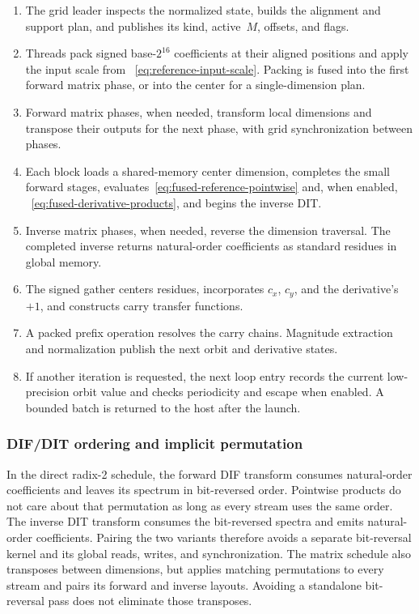\begin{enumerate}
  \item The grid leader inspects the normalized state, builds the alignment and
        support plan, and publishes its kind, active~$M$, offsets, and flags.
  \item Threads pack signed base-$2^{16}$ coefficients at their aligned
        positions and apply the input scale from
        ~\eqref{eq:reference-input-scale}.  Packing is fused into the first
        forward matrix phase, or into the center for a single-dimension plan.
  \item Forward matrix phases, when needed, transform local dimensions and
        transpose their outputs for the next phase, with grid synchronization
        between phases.
  \item Each block loads a shared-memory center dimension, completes the small
        forward stages, evaluates~\eqref{eq:fused-reference-pointwise} and, when enabled,
        ~\eqref{eq:fused-derivative-products}, and begins the inverse DIT.
  \item Inverse matrix phases, when needed, reverse the dimension traversal.
        The completed inverse returns natural-order coefficients as standard
        residues in global memory.
  \item The signed gather centers residues, incorporates $c_x$, $c_y$, and the
        derivative's $+1$, and constructs carry transfer functions.
  \item A packed prefix operation resolves the carry chains.  Magnitude
        extraction and normalization publish the next orbit and derivative
        states.
  \item If another iteration is requested, the next loop entry records the
        current low-precision orbit value and checks periodicity and escape
        when enabled.  A bounded batch is returned to the host after the launch.
\end{enumerate}

\subsubsection{DIF/DIT ordering and implicit permutation}

In the direct radix-2 schedule, the forward DIF transform consumes natural-order
coefficients and leaves its spectrum in bit-reversed order.  Pointwise products do not care about that
permutation as long as every stream uses the same order.  The inverse DIT
transform consumes the bit-reversed spectra and emits natural-order
coefficients.  Pairing the two variants therefore avoids a separate bit-reversal
kernel and its global reads, writes, and synchronization.  The matrix schedule
also transposes between dimensions, but applies matching permutations to every
stream and pairs its forward and inverse layouts.  Avoiding a standalone
bit-reversal pass does not eliminate those transposes.


